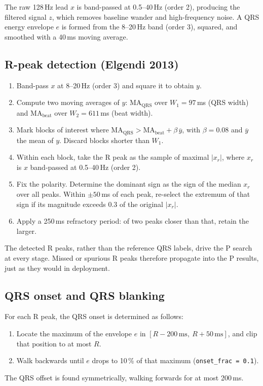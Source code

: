 \documentclass[11pt,a4paper]{article}
\newcommand{\code}[1]{\texttt{#1}}
\newcommand{\ms}{\,\mathrm{ms}}
\begin{document}
The raw 128\,Hz lead $x$ is band-passed at 0.5--40\,Hz (order 2), producing the filtered signal $z$, which removes baseline wander and high-frequency noise. A QRS energy envelope $e$ is formed from the 8--20\,Hz band (order 3), squared, and smoothed with a 40\,ms moving average.

\subsection{R-peak detection (Elgendi 2013)}

\begin{enumerate}
\item Band-pass $x$ at 8--20\,Hz (order 3) and square it to obtain $y$.
\item Compute two moving averages of $y$: $\mathrm{MA}_\mathrm{QRS}$ over $W_1 = 97$\,ms (QRS width) and $\mathrm{MA}_\mathrm{beat}$ over $W_2 = 611$\,ms (beat width).
\item Mark blocks of interest where $\mathrm{MA}_\mathrm{QRS} > \mathrm{MA}_\mathrm{beat} + \beta\,\overline{y}$, with $\beta = 0.08$ and $\overline{y}$ the mean of $y$. Discard blocks shorter than $W_1$.
\item Within each block, take the R peak as the sample of maximal $|x_r|$, where $x_r$ is $x$ band-passed at 0.5--40\,Hz (order 2).
\item Fix the polarity. Determine the dominant sign as the sign of the median $x_r$ over all peaks. Within $\pm50$\,ms of each peak, re-select the extremum of that sign if its magnitude exceeds 0.3 of the original $|x_r|$.
\item Apply a 250\,ms refractory period: of two peaks closer than that, retain the larger.
\end{enumerate}
The detected R peaks, rather than the reference QRS labels, drive the P search at every stage. Missed or spurious R peaks therefore propagate into the P results, just as they would in deployment.

\subsection{QRS onset and QRS blanking}

For each R peak, the QRS onset is determined as follows:
\begin{enumerate}
\item Locate the maximum of the envelope $e$ in $[R - 200\ms,\ R + 50\ms]$, and clip that position to at most $R$.
\item Walk backwards until $e$ drops to 10\,\% of that maximum (\code{onset\_frac = 0.1}).
\end{enumerate}
The QRS offset is found symmetrically, walking forwards for at most 200\,ms.
\end{document}
